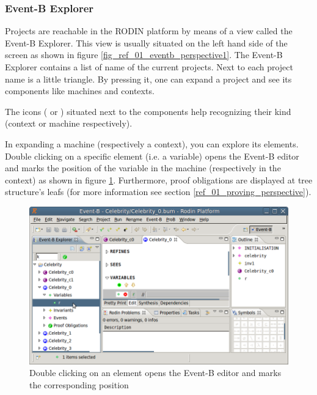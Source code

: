 \subsubsection{Event-B Explorer}
\label{reference_01_eventb_explorer}

Projects are reachable in the RODIN platform by means of a view called the \textsf{Event-B Explorer}. This view is usually situated on the left hand side of the screen as shown in figure \ref{fig_ref_01_eventb_perspective1}. The \textsf{Event-B Explorer} contains a list of name of the current projects. Next to each project name is a little triangle. By pressing it, one can expand a project and see its components like machines and contexts.

The icons ( or ) situated next to the components help recognizing their kind (context or machine respectively).

In expanding a machine (respectively a context), you can explore its elements. Double clicking on a specific element (i.e. a variable) opens the Event-B editor and marks the position of the variable in the machine (respectively in the context) as shown in figure \ref{fig_ref_01_project_explorer1}. Furthermore, proof obligations are displayed at tree structure's leafs (for more information see section \ref{ref_01_proving_perspective}).

\begin{figure}[!h]
\begin{center}
	\includegraphics{img/reference/ref_01_project_explorer1.png}
	\caption{Double clicking on an element opens the Event-B editor and marks the corresponding position}
	\label{fig_ref_01_project_explorer1}
\end{center}
\end{figure}


